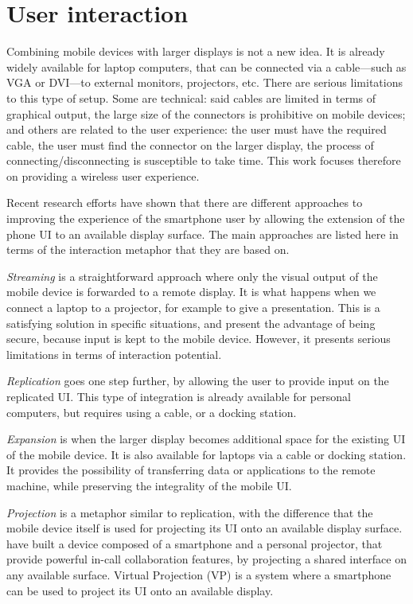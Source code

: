 \section{User interaction}


Combining mobile devices with larger displays is not a new idea.
It is already widely available for laptop computers, that can be connected via a cable---such as VGA or DVI---to external monitors, projectors, etc.
There are serious limitations to this type of setup.
Some are technical: said cables are limited in terms of graphical output, the large size of the connectors is prohibitive on mobile devices; and others are related to the user experience: the user must have the required cable, the user must find the connector on the larger display, the process of connecting/disconnecting is susceptible to take time.
This work focuses therefore on providing a wireless user experience.

Recent research efforts have shown that there are different approaches to improving the experience of the smartphone user by allowing the extension of the phone UI to an available display surface.
The main approaches are listed here in terms of the interaction metaphor that they are based on.

\emph{Streaming} is a straightforward approach where only the visual output of the mobile device is forwarded to a remote display.
It is what happens when we connect a laptop to a projector, for example to give a presentation.
This is a satisfying solution in specific situations, and present the advantage of being secure, because input is kept to the mobile device.
However, it presents serious limitations in terms of interaction potential.

\emph{Replication} goes one step further, by allowing the user to provide input on the replicated UI.
This type of integration is already available for personal computers, but requires using a cable, or a docking station.

\emph{Expansion} is when the larger display becomes additional space for the existing UI of the mobile device.
It is also available for laptops via a cable or docking station.
It provides the possibility of transferring data or applications to the remote  machine, while preserving the integrality of the mobile UI.

\emph{Projection} is a metaphor similar to replication, with the difference that the mobile device itself is used for projecting its UI onto an available display surface.
\cite{Winkler:2011:interactivephonecall} have built a device composed of a smartphone and a personal projector, that provide powerful in-call collaboration features, by projecting a shared interface on any available surface.
Virtual Projection (VP) \citep{Baur:2012:virtualprojection} is a system where a smartphone can be used to project its UI onto an available display.

